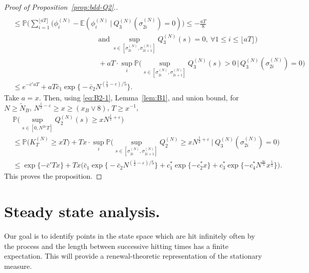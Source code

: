 \documentclass[11pt, reqno]{article}
\numberwithin{equation}{section}
\numberwithin{theorem}{section}
\begin{document}
\begin{proof}[Proof of Proposition~\ref{prop:bdd-Q2}.]
\begin{equation*}
\begin{split}
    \end{split}
\end{equation*}
\begin{equation}
    \begin{split}
        &\leq  \mathbb{P}\bigg(\sum_{i=1}^{\lfloor aT \rfloor}\Big(\phi^{(N)}_i-\mathbb{E}(\phi^{(N)}_i\ |\ Q^{(N)}_3(\sigma^{(N)}_{2i})=0)\Big)\leq -\frac{aT}{8}\\ 
        &\hspace{5cm}\text{and}\ \sup_{s\in[\sigma^{(N)}_{2i},\sigma^{(N)}_{2i+1}]}Q^{(N)}_3(s)=0,\ \forall 1\leq i\leq \lfloor aT \rfloor\bigg)  \\
    &\hspace{5cm}+aT\cdot\sup_i\mathbb{P}\Big(\sup_{s\in[\sigma^{(N)}_{2i},\sigma^{(N)}_{2i+1}]}Q^{(N)}_3(s)>0 \, \Big| \, Q^{(N)}_3(\sigma^{(N)}_{2i})=0\Big)\\
    &\leq e^{-\bar{c}'aT}+aT\bar{c}_1\exp \big\{-\bar{c}_2N^{(\frac{1}{2}-\varepsilon)/5}\big\}.
    \end{split}
\end{equation}
Take $a=x$. Then, using \eqref{eq:B2-1}, Lemma~\ref{lem:B1}, and union bound, for $N\geq \tilde N_B$, $ N^{\frac{1}{2}-\varepsilon}\geq x\geq(x_B\vee 8)$, $T \ge x^{-1}$,
\begin{align*}
    &\mathbb{P}\Big(\sup_{s\in[0,N^{2\varepsilon}T]}Q^{(N)}_2(s)
    \geq xN^{\frac{1}{2}+\varepsilon}\Big)\\
    &\leq \mathbb{P}\Big(K^{(N)}_T\geq xT\Big)+Tx\cdot \sup_i\mathbb{P}\Big(\sup_{s\in[\sigma^{(N)}_{2i},\sigma^{(N)}_{2i+1}]}Q^{(N)}_2\geq xN^{\frac{1}{2}+\varepsilon}\ \Big|\ Q^{(N)}_3(\sigma^{(N)}_{2i})=0\Big)\\
    &\leq \exp\{-\bar{c}'Tx\}+Tx\Big(\bar{c}_1\exp \big\{-\bar{c}_2N^{(\frac{1}{2}-\varepsilon)/5}\big\}+c^*_1\exp\{-c^*_2x\}+c^*_3\exp\{-c^*_4N^{\frac{4\varepsilon}{5}}x^{\frac{1}{5}}\}\Big).
\end{align*}
This proves the proposition.

\end{proof}


\section{Steady state analysis.}\label{sec:STEAYSTATE}
Our goal is to identify points in the state space which are hit infinitely often by the process and 
the length between successive hitting times has a finite expectation. 
This will provide a renewal-theoretic representation of the stationary measure.
\end{document}
